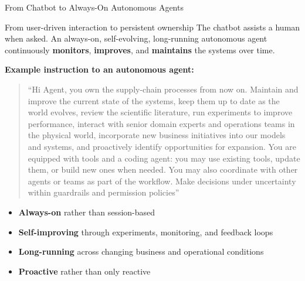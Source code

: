 \begin{frame}{From Chatbot to Always-On Autonomous Agents}

\begin{block}{From user-driven interaction to persistent ownership}
The chatbot assists a human when asked.  
An always-on, self-evolving, long-running autonomous agent continuously \textbf{monitors}, \textbf{improves}, and \textbf{maintains} the systems over time.
\end{block}

\vspace{0.4em}
\textbf{Example instruction to an autonomous agent:}
\begin{quote}
\small
``Hi Agent, you own the supply-chain processes from now on. Maintain and improve the current state of the systems, keep them up to date as the world evolves, review the scientific literature, run experiments to improve performance, interact with senior domain experts and operations teams in the physical world, incorporate new business initiatives into our models and systems, and proactively identify opportunities for expansion. You are equipped with tools and a coding agent: you may use existing tools, update them, or build new ones when needed. You may also coordinate with other agents or teams as part of the workflow. Make decisions under uncertainty within guardrails and permission policies''
\end{quote}

\vspace{0.4em}
\begin{itemize}
  \item \textbf{Always-on} rather than session-based
  \item \textbf{Self-improving} through experiments, monitoring, and feedback loops
  \item \textbf{Long-running} across changing business and operational conditions
  \item \textbf{Proactive} rather than only reactive
\end{itemize}

\end{frame}


